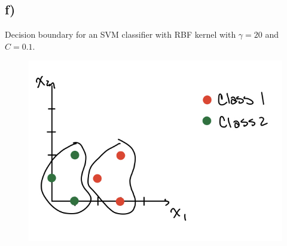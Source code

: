 \documentclass[12pt, letterpaper]{article}
\begin{document}
\subsection*{f)}Decision boundary for an SVM classifier with RBF kernel with $\gamma = 20$ and $C = 0.1$.
\FloatBarrier
\begin{figure}[h!]
  \includegraphics[scale=0.33]{./images/8f.jpg}
\end{figure}
\end{document}
